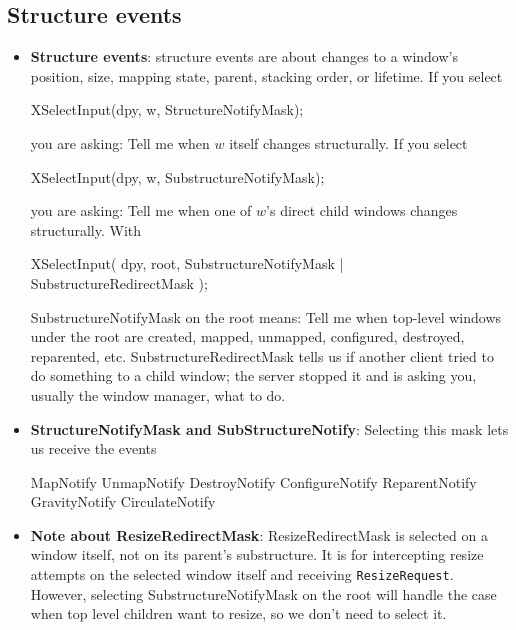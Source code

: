 \documentclass{report}
\begin{document}
    \subsection{Structure events}
    \begin{itemize}
        \item \textbf{Structure events}: structure events are about changes to a window’s position, size, mapping state, parent, stacking order, or lifetime.
            \bigbreak \noindent 
            If you select 
            \bigbreak \noindent 
            \begin{cppcode}
            XSelectInput(dpy, w, StructureNotifyMask);
            \end{cppcode}
            \bigbreak \noindent 
            you are asking: Tell me when $w$ itself changes structurally.
            \bigbreak \noindent 
            If you select
            \bigbreak \noindent 
            \begin{cppcode}
            XSelectInput(dpy, w, SubstructureNotifyMask);
            \end{cppcode}
            \bigbreak \noindent 
            you are asking: Tell me when one of $w$'s direct child windows changes structurally.
            \bigbreak \noindent 
            With
            \bigbreak \noindent 
            \begin{cppcode}
                XSelectInput(
                    dpy,
                    root,
                    SubstructureNotifyMask | SubstructureRedirectMask
                );
            \end{cppcode}
            \bigbreak \noindent 
            SubstructureNotifyMask on the root means: Tell me when top-level windows under the root are created, mapped, unmapped, configured, destroyed, reparented, etc.
            \bigbreak \noindent 
            SubstructureRedirectMask tells us if another client tried to do something to a child window; the server stopped it and is asking you, usually the window manager, what to do.
        \item \textbf{StructureNotifyMask and SubStructureNotify}: Selecting this mask lets us receive the events
            \bigbreak \noindent 
            \begin{cppcode}
                MapNotify
                UnmapNotify
                DestroyNotify
                ConfigureNotify
                ReparentNotify
                GravityNotify
                CirculateNotify
            \end{cppcode}
        \item \textbf{Note about ResizeRedirectMask}: ResizeRedirectMask is selected on a window itself, not on its parent’s substructure. It is for intercepting resize attempts on the selected window itself and receiving \texttt{ResizeRequest}.  
            \bigbreak \noindent 
            However, selecting SubstructureNotifyMask on the root will handle the case when top level children want to resize, so we don't need to select it.

    \end{itemize}
\end{document}
